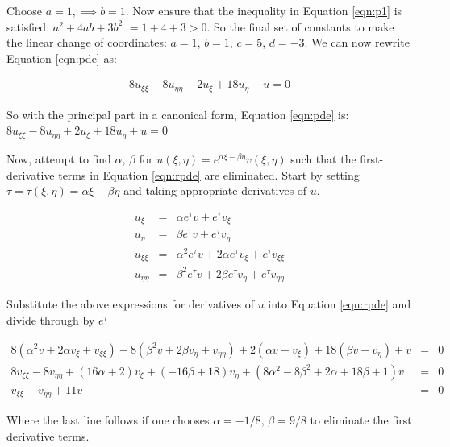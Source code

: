 \documentclass[a4paper,12pt]{article}
\begin{document}
Choose $a = 1,\implies b = 1$. Now ensure that the inequality in Equation \ref{eqn:p1} is satisfied: $a^2 + 4ab + 3b^2$ $= 1 + 4 + 3 > 0$. So the final set of constants to make the linear change of coordinates: $a = 1$, $b = 1$, $c = 5$, $d = -3$. We can now rewrite Equation \ref{eqn:pde} as:

\begin{eqnarray}
8u_{\xi\xi} - 8u_{\eta\eta} + 2u_{\xi} + 18u_{\eta} + u = 0\label{eqn:rpde}
\end{eqnarray}

So with the principal part in a canonical form, Equation \ref{eqn:pde} is: $\boxed{8u_{\xi\xi} - 8u_{\eta\eta} + 2u_{\xi} + 18u_{\eta} + u = 0}$

Now, attempt to find $\alpha,\,\beta$ for $u(\xi,\eta) = e^{\alpha\xi - \beta\eta}v(\xi,\eta)$ such that the first-derivative terms in Equation \ref{eqn:rpde} are eliminated. Start by setting $\tau =\tau(\xi,\eta)= \alpha\xi - \beta\eta$ and taking appropriate derivatives of $u$.

\begin{eqnarray}
u_{\xi} &=& \alpha e^{\tau}v + e^{\tau}v_{\xi}\nonumber\\
u_{\eta} &=& \beta e^{\tau}v + e^{\tau}v_{\eta}\nonumber\\
u_{\xi\xi} &=& \alpha^2e^{\tau}v + 2\alpha e^{\tau}v_{\xi} + e^{\tau}v_{\xi\xi}\nonumber\\
u_{\eta\eta} &=& \beta^2e^{\tau}v + 2\beta e^{\tau}v_{\eta} + e^{\tau}v_{\eta\eta}\nonumber
\end{eqnarray}

Substitute the above expressions for derivatives of $u$ into Equation \ref{eqn:rpde} and divide through by $e^{\tau}$

\begin{eqnarray}
8(\alpha^2v + 2\alpha v_{\xi} + v_{\xi\xi}) - 8(\beta^2v + 2\beta v_{\eta} + v_{\eta\eta}) + 2(\alpha v + v_{\xi}) + 18(\beta v + v_{\eta}) + v &=& 0\nonumber\\
8v_{\xi\xi} - 8v_{\eta\eta} + (16\alpha + 2)v_{\xi} + (-16\beta + 18)v_{\eta} + (8\alpha^2 - 8\beta^2 + 2\alpha + 18\beta + 1)v &=& 0\nonumber\\
v_{\xi\xi} - v_{\eta\eta} + 11v &=& 0\nonumber
\end{eqnarray}

Where the last line follows if one chooses $\boxed{\alpha = -1/8,\,\beta = 9/8}$ to eliminate the first derivative terms.
\end{document}
